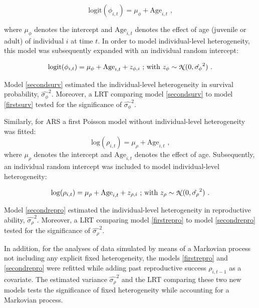 \begin{equation}\label{firstsurv}
\mathrm{logit}(\phi_{i,t}) = \mu_{\phi}+\mathrm{Age}_{i,t}\text{ ,}
\end{equation}

where $\mu_{\phi}$ denotes the intercept and $\mathrm{Age}_{i,t}$ denotes the effect of age (juvenile or adult) of individual $i$ at time $t$.
In order to model individual-level heterogeneity, this model was subsequently expanded with an individual random intercept:

\begin{equation}\label{secondsurv}
\mathrm{logit}(\phi_{i,t}) = \mu_{\phi}+\mathrm{Age}_{i,t}+z_{\phi,i}\text{ ; with } z_{\phi}\sim \text{\fontfamily{pzc}\selectfont N }(0,\hat{\sigma_{\phi}}^2) \text{ .}
\end{equation}

Model \eqref{secondsurv} estimated the individual-level heterogeneity in survival probability, $\hat{\sigma_{\phi}}^2$. Moreover, a LRT comparing model \eqref{secondsurv} to model \eqref{firstsurv} tested for the significance of $\hat{\sigma_{\phi}}^2$.

Similarly, for ARS a first Poisson model without individual-level heterogeneity was fitted:
\begin{equation}\label{firstrepro}
\mathrm{log}(\rho_{i,t}) = \mu_{\rho}+ \mathrm{Age}_{i,t} \text{ ,}
\end{equation}
where $\mu_{\rho}$ denotes the intercept and $\mathrm{Age}_{i,t}$ denotes the effect of age. Subsequently, an individual random intercept was included to model individual-level heterogeneity:

\begin{equation}\label{secondrepro}
\mathrm{log}(\rho_{i,t}) = \mu_{\rho}+\mathrm{Age}_{i,t}+z_{\rho,i}\text{ ; with } z_{\rho}\sim \text{\fontfamily{pzc}\selectfont N }(0,\hat{\sigma_{\rho}}^2) \text{ .}
\end{equation}

Model \eqref{secondrepro} estimated the individual-level heterogeneity in reproductive ability, $\hat{\sigma_{\rho}}^2$. Moreover, a LRT comparing model \eqref{firstrepro} to model \eqref{secondrepro} tested for the significance of $\hat{\sigma_{\rho}}^2$. 

In addition, for the analyses of data simulated by means of a Markovian process not including any explicit fixed heterogeneity, the models \eqref{firstrepro} and \eqref{secondrepro} were refitted while adding past reproductive success $\rho_{i,t-1}$ as a covariate. The estimated variance $\hat{\sigma_{\rho}}^2$ and the LRT comparing these two new models tests the significance of fixed heterogeneity while accounting for a Markovian process.


